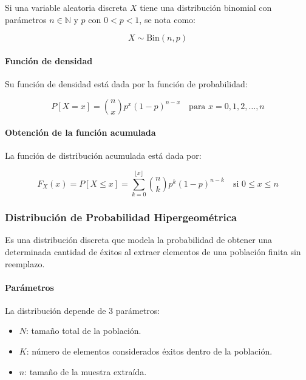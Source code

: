 \documentclass{article}
\begin{document}
Si una variable aleatoria discreta $X$ tiene una distribución binomial con parámetros
$n \in \mathbb{N}$ y $p$ con $0 < p < 1$, se nota como:

\begin{equation}
    X \sim \mathrm{Bin}(n, p)
\end{equation}

\paragraph{Función de densidad}

Su función de densidad está dada por la función de probabilidad:

\begin{equation}
    P[X = x] = \binom{n}{x} p^x (1-p)^{n-x} \quad \text{para } x = 0, 1, 2, \ldots, n
\end{equation}

\paragraph{Obtención de la función acumulada}

La función de distribución acumulada está dada por:

\begin{equation}
    F_X(x) = P[X \leq x] = \sum_{k=0}^{\lfloor x \rfloor} \binom{n}{k} p^k (1-p)^{n-k}
    \quad \text{si } 0 \leq x \leq n
\end{equation}


\subsubsection{Distribución de Probabilidad Hipergeométrica}

Es una distribución discreta que modela la probabilidad de obtener una determinada
cantidad de éxitos al extraer elementos de una población finita sin reemplazo.

\paragraph{Parámetros}

La distribución depende de 3 parámetros:

\begin{itemize}
    \item $N$: tamaño total de la población.
    \item $K$: número de elementos considerados éxitos dentro de la población.
    \item $n$: tamaño de la muestra extraída.
\end{itemize}
\end{document}
